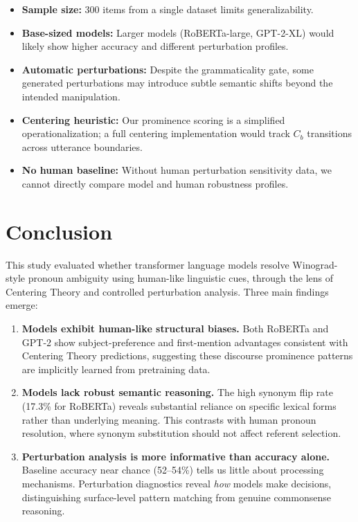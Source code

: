\documentclass[11pt]{article}
\begin{document}
\begin{itemize}[leftmargin=*]
    \item \textbf{Sample size:} 300 items from a single dataset limits generalizability.
    \item \textbf{Base-sized models:} Larger models (RoBERTa-large, GPT-2-XL) would likely show higher accuracy and different perturbation profiles.
    \item \textbf{Automatic perturbations:} Despite the grammaticality gate, some generated perturbations may introduce subtle semantic shifts beyond the intended manipulation.
    \item \textbf{Centering heuristic:} Our prominence scoring is a simplified operationalization; a full centering implementation would track $C_b$ transitions across utterance boundaries.
    \item \textbf{No human baseline:} Without human perturbation sensitivity data, we cannot directly compare model and human robustness profiles.
\end{itemize}

\section{Conclusion}

This study evaluated whether transformer language models resolve Winograd-style pronoun ambiguity using human-like linguistic cues, through the lens of Centering Theory and controlled perturbation analysis. Three main findings emerge:

\begin{enumerate}[leftmargin=*]
    \item \textbf{Models exhibit human-like structural biases.} Both RoBERTa and GPT-2 show subject-preference and first-mention advantages consistent with Centering Theory predictions, suggesting these discourse prominence patterns are implicitly learned from pretraining data.

    \item \textbf{Models lack robust semantic reasoning.} The high synonym flip rate (17.3\% for RoBERTa) reveals substantial reliance on specific lexical forms rather than underlying meaning. This contrasts with human pronoun resolution, where synonym substitution should not affect referent selection.

    \item \textbf{Perturbation analysis is more informative than accuracy alone.} Baseline accuracy near chance (52--54\%) tells us little about processing mechanisms. Perturbation diagnostics reveal \emph{how} models make decisions, distinguishing surface-level pattern matching from genuine commonsense reasoning.
\end{enumerate}
\end{document}
